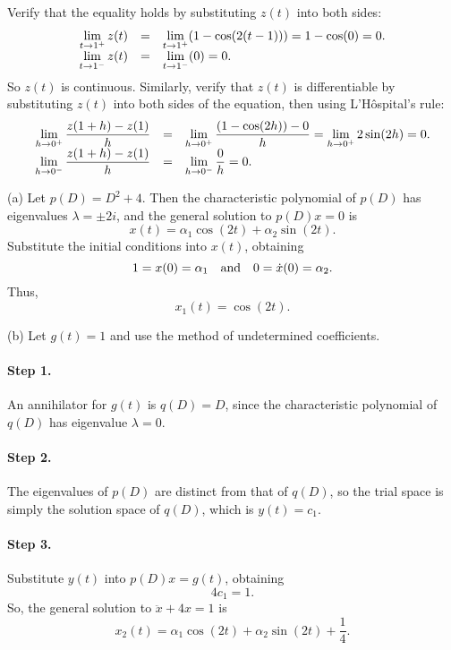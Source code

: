 \documentclass{ximera}
\begin{document}
 Verify that the equality holds by substituting $z(t)$ into
both sides:
\[
\begin{array}{rcl}
\displaystyle \lim_{t \rightarrow 1^{+}}z(t) & = &
\displaystyle \lim_{t \rightarrow 1^{+}}(1 - \cos(2(t - 1))) = 1 - \cos(0) = 0. \\
\displaystyle \lim_{t \rightarrow 1^{-}}z(t) & = &
\displaystyle \lim_{t \rightarrow 1^{-}}(0) = 0.
\end{array}
\]
So $z(t)$ is continuous.  Similarly, verify that $z(t)$ is differentiable
by substituting $z(t)$ into both sides of the equation, then using
L'H\^{o}spital's rule:
\[
\begin{array}{rcl}
\displaystyle \lim_{h \rightarrow 0^{+}}\frac{z(1 + h) - z(1)}{h}
& = & \displaystyle \lim_{h \rightarrow 0^{+}}\frac{(1 - \cos(2h)) - 0}{h}
= \displaystyle \lim_{h \rightarrow 0^{+}}2\sin(2h) = 0. \\
\displaystyle \lim_{h \rightarrow 0^{-}}\frac{z(1 + h) - z(1)}{h}
& = & \displaystyle \lim_{h \rightarrow 0^{-}}\frac{0}{h} = 0.
\end{array}
\]

(a) Let $p(D) = D^2 + 4$.  Then the characteristic polynomial of
$p(D)$ has eigenvalues $\lambda = \pm 2i$, and the general solution to
$p(D)x = 0$ is
\[
x(t) = \alpha_1\cos(2t) + \alpha_2\sin(2t).
\]
Substitute the initial conditions into $x(t)$, obtaining
\[
1 = x(0) = \alpha_1 \quad\mbox{and}\quad
0 = \dot{x}(0) = \alpha_2.
\]
Thus,
\[
x_1(t) = \cos(2t).
\]

(b) Let $g(t) = 1$ and use the method of undetermined coefficients.
\paragraph{Step 1.} An annihilator for $g(t)$ is $q(D) = D$, since
the characteristic polynomial of $q(D)$ has eigenvalue $\lambda = 0$.

\paragraph{Step 2.} The eigenvalues of $p(D)$ are distinct from that
of $q(D)$, so the trial space is simply the solution space of $q(D)$,
which is $y(t) = c_1$.

\paragraph{Step 3.} Substitute $y(t)$ into $p(D)x = g(t)$, obtaining
\[
4c_1 = 1.
\]
So, the general solution to $\ddot{x} + 4x = 1$ is
\[
x_2(t) = \alpha_1\cos(2t) + \alpha_2\sin(2t) + \frac{1}{4}.
\]
\end{document}
